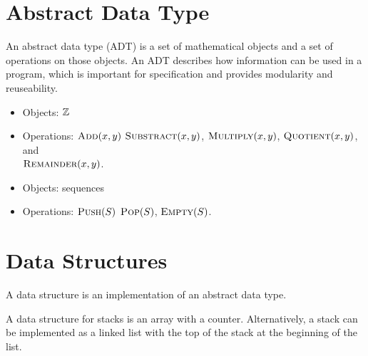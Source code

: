 \section{Abstract Data Type}  

\vspace{0.5\parskip}

\begin{definition}
    An abstract data type (ADT) is a set of mathematical objects and a set of operations on those objects. An ADT describes how information can be used in a program, which is important for specification and provides modularity and reuseability.
\end{definition}

\begin{example}
    \hfill
    \begin{itemize}
        \item Objects: $\mathbb{Z}$
        \item Operations: $\textsc{Add}(x,y)$ $\textsc{Substract}(x,y)$, $\textsc{Multiply}(x,y)$, $\textsc{Quotient}(x,y)$, and \\ $\textsc{Remainder}(x,y)$.
    \end{itemize}
\end{example}
\begin{example}
    \hfill
    \begin{itemize}
        \item Objects: sequences
        \item Operations: $\textsc{Push}(S)$ $\textsc{Pop}(S)$, $\textsc{Empty}(S)$.
    \end{itemize}
\end{example}

\section{Data Structures}

\vspace{0.5\parskip}

\begin{definition} 
    A data structure is an implementation of an abstract data type.
\end{definition}

\begin{example}
    A data structure for stacks is an array with a counter. Alternatively, a stack can be implemented as a linked list with the top of the stack at the beginning of the list.
\end{example}

